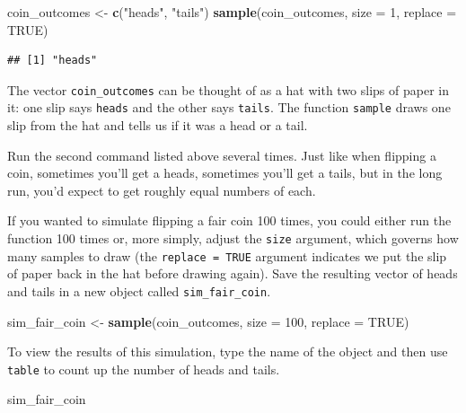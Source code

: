 \documentclass[
]{article}
\newenvironment{Shaded}{\begin{snugshade}}{\end{snugshade}}
\newcommand{\AttributeTok}[1]{\textcolor[rgb]{0.13,0.29,0.53}{#1}}
\newcommand{\ConstantTok}[1]{\textcolor[rgb]{0.56,0.35,0.01}{#1}}
\newcommand{\DecValTok}[1]{\textcolor[rgb]{0.00,0.00,0.81}{#1}}
\newcommand{\FunctionTok}[1]{\textcolor[rgb]{0.13,0.29,0.53}{\textbf{#1}}}
\newcommand{\NormalTok}[1]{#1}
\newcommand{\OtherTok}[1]{\textcolor[rgb]{0.56,0.35,0.01}{#1}}
\newcommand{\StringTok}[1]{\textcolor[rgb]{0.31,0.60,0.02}{#1}}
\begin{document}
\begin{Shaded}
\begin{Highlighting}[]
\NormalTok{coin\_outcomes }\OtherTok{\textless{}{-}} \FunctionTok{c}\NormalTok{(}\StringTok{"heads"}\NormalTok{, }\StringTok{"tails"}\NormalTok{)}
\FunctionTok{sample}\NormalTok{(coin\_outcomes, }\AttributeTok{size =} \DecValTok{1}\NormalTok{, }\AttributeTok{replace =} \ConstantTok{TRUE}\NormalTok{)}
\end{Highlighting}
\end{Shaded}

\begin{verbatim}
## [1] "heads"
\end{verbatim}

The vector \texttt{coin\_outcomes} can be thought of as a hat with two
slips of paper in it: one slip says \texttt{heads} and the other says
\texttt{tails}. The function \texttt{sample} draws one slip from the hat
and tells us if it was a head or a tail.

Run the second command listed above several times. Just like when
flipping a coin, sometimes you'll get a heads, sometimes you'll get a
tails, but in the long run, you'd expect to get roughly equal numbers of
each.

If you wanted to simulate flipping a fair coin 100 times, you could
either run the function 100 times or, more simply, adjust the
\texttt{size} argument, which governs how many samples to draw (the
\texttt{replace\ =\ TRUE} argument indicates we put the slip of paper
back in the hat before drawing again). Save the resulting vector of
heads and tails in a new object called \texttt{sim\_fair\_coin}.

\begin{Shaded}
\begin{Highlighting}[]
\NormalTok{sim\_fair\_coin }\OtherTok{\textless{}{-}} \FunctionTok{sample}\NormalTok{(coin\_outcomes, }\AttributeTok{size =} \DecValTok{100}\NormalTok{, }\AttributeTok{replace =} \ConstantTok{TRUE}\NormalTok{)}
\end{Highlighting}
\end{Shaded}

To view the results of this simulation, type the name of the object and
then use \texttt{table} to count up the number of heads and tails.

\begin{Shaded}
\begin{Highlighting}[]
\NormalTok{sim\_fair\_coin}
\end{Highlighting}
\end{Shaded}
\end{document}
